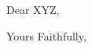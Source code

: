 \documentclass{letter}
\begin{document}
 
	\begin{letter}{}
		\opening{
		Dear XYZ,
		}
	

	\closing{Yours Faithfully,}

	\end{letter}
\end{document}

